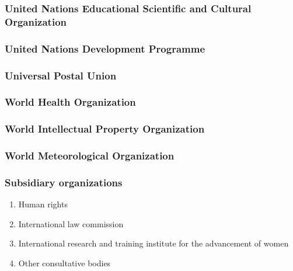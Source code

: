 \documentclass[
  openany]{book}
\providecommand{\tightlist}{%
  \setlength{\itemsep}{0pt}\setlength{\parskip}{0pt}}
\begin{document}
\hypertarget{united-nations-educational-scientific-and-cultural-organization}{%
\subsubsection{United Nations Educational Scientific and Cultural Organization}\label{united-nations-educational-scientific-and-cultural-organization}}

\hypertarget{united-nations-development-programme}{%
\subsubsection{United Nations Development Programme}\label{united-nations-development-programme}}

\hypertarget{universal-postal-union}{%
\subsubsection{Universal Postal Union}\label{universal-postal-union}}

\hypertarget{world-health-organization}{%
\subsubsection{World Health Organization}\label{world-health-organization}}

\hypertarget{world-intellectual-property-organization}{%
\subsubsection{World Intellectual Property Organization}\label{world-intellectual-property-organization}}

\hypertarget{world-meteorological-organization}{%
\subsubsection{World Meteorological Organization}\label{world-meteorological-organization}}

\hypertarget{subsidiary-organizations}{%
\subsubsection{Subsidiary organizations}\label{subsidiary-organizations}}

\begin{enumerate}
\def\labelenumi{\arabic{enumi}.}
\tightlist
\item
  Human rights
\item
  International law commission
\item
  International research and training institute for the advancement of women
\item
  Other consultative bodies
\end{enumerate}
\end{document}
